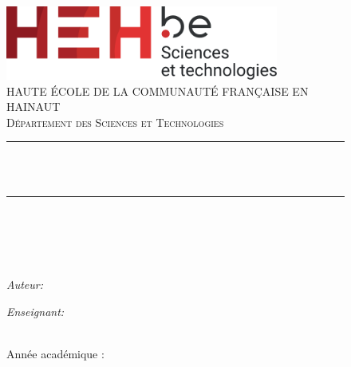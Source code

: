 
\thispagestyle{empty}

\begin{figure}[!t]
  \centering
  \includegraphics[width=0.8\textwidth]{img/logo/tech.pdf}\\[1cm]
  \textsc{\large HAUTE ÉCOLE DE LA COMMUNAUTÉ FRANÇAISE EN HAINAUT}\\[0.5cm]
  \textsc{\large Département des Sciences et Technologies}\\[2.5cm]

\end{figure}

\begin{figure}
  \centering
  \begingroup
  \rule{\linewidth}{0.5mm}\\
  \makeatletter
  \huge \@title \\
  \vspace{0.5cm}
  \large \soustitre

  \rule{\linewidth}{0.5mm}\\[1cm]
  \endgroup
\end{figure}


\begin{figure}
  \centering
  \textsc{\LARGE \cours}\\[0.5cm]
  \textsc{\large \cursus}\\[2cm]
\end{figure}

\begin{figure}[!b]
  \centering
  \begin{minipage}[t]{0.45 \textwidth}
    \begin{flushleft} \large
      \emph{Auteur:}\\
      \makeatletter
      \auteur
    \end{flushleft}
  \end{minipage}
%
  \begin{minipage}[t]{0.45 \textwidth}
    \begin{flushright}
      \large \emph{Enseignant:} \\
      \teacher
    \end{flushright}
  \end{minipage}\\[3cm]

  Année académique : \academicyear
\end{figure}
\newpage

